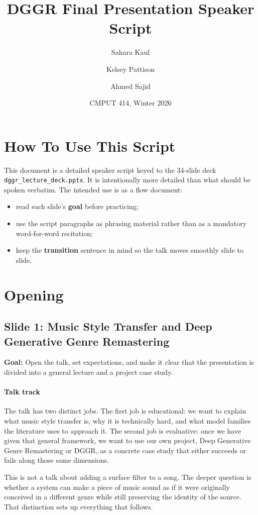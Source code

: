\documentclass[11pt]{article}
\title{DGGR Final Presentation Speaker Script}
\author{Sahara Kaul \and Kelsey Pattison \and Ahmed Sajid}
\date{CMPUT 414, Winter 2026}
\begin{document}
\maketitle
\tableofcontents
\newpage
\section*{How To Use This Script}
This document is a detailed speaker script keyed to the 34-slide deck \texttt{dggr\_lecture\_deck.pptx}.
It is intentionally more detailed than what should be spoken verbatim. The intended use is as a flow document:
\begin{itemize}
\item read each slide's \textbf{goal} before practicing;
\item use the script paragraphs as phrasing material rather than as a mandatory word-for-word recitation;
\item keep the \textbf{transition} sentence in mind so the talk moves smoothly slide to slide.
\end{itemize}
\newpage
\newpage
\section{Opening}
\subsection*{Slide 1: Music Style Transfer and Deep Generative Genre Remastering}
\textbf{Goal:} Open the talk, set expectations, and make it clear that the presentation is divided into a general lecture and a project case study.
\paragraph{Talk track}
The talk has two distinct jobs. The first job is educational: we want to explain what music style transfer is, why it is technically hard, and what model families the literature uses to approach it. The second job is evaluative: once we have given that general framework, we want to use our own project, Deep Generative Genre Remastering or DGGR, as a concrete case study that either succeeds or fails along those same dimensions.

This is not a talk about adding a surface filter to a song. The deeper question is whether a system can make a piece of music sound as if it were originally conceived in a different genre while still preserving the identity of the source. That distinction sets up everything that follows.
\end{document}
